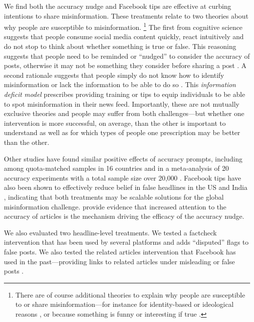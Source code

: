 \documentclass[letterpaper, 12pt, parskip=full,DIV=10]{scrartcl}
\begin{document}
We find both the accuracy nudge and Facebook tips are effective at curbing intentions to share misinformation. These treatments relate to two theories about why people are susceptible to misinformation.%
\footnote{
 There are of course additional theories to explain why people are susceptible to or share misinformation---for instance for identity-based or ideological reasons \citep{nyhan2010corrections}, or because something is funny or interesting if true \citep{altay2022if}. %
}
The first from cognitive science suggests that people consume social media content quickly, react intuitively and do not stop to think about whether something is true or false. This reasoning suggests that people need to be reminded or ``nudged'' to consider the accuracy of posts, otherwise it may not be something they consider before sharing a post \citep{pennycook2021psychology, pennycook2021shifting}. A second rationale suggests that people simply do not know how to identify misinformation or lack the information to be able to do so \citep{ecker2022psychological}. This \textit{information deficit model} prescribes providing training or tips to equip individuals to be able to spot misinformation in their news feed. Importantly, these are not mutually exclusive theories and people may suffer from both challenges---but whether one intervention is more successful, on average, than the other is important to understand as well as for which types of people one prescription may be better than the other. 

Other studies have found similar positive effects of accuracy prompts, including among quota-matched samples in 16 countries \citep{arechar2022understanding} and in a meta-analysis of 20 accuracy experiments with a total sample size over 20,000 \citep{pennycook2022accuracy}. Facebook tips have also been shown to effectively reduce belief in false headlines in the US and India \citep{guessetal2020digital}, indicating that both treatments may be scalable solutions for the global misinformation challenge. \citet{pennycook2021shifting} provide evidence that increased attention to the accuracy of articles is the mechanism driving the efficacy of the accuracy nudge. 

We also evaluated two headline-level treatments. We tested a factcheck intervention that has been used by several platforms and adds ``disputed'' flags to false posts. We also tested the related articles intervention that Facebook has used in the past---providing links to related articles under misleading or false posts \citep{ghosh2017facebook}.
\end{document}
